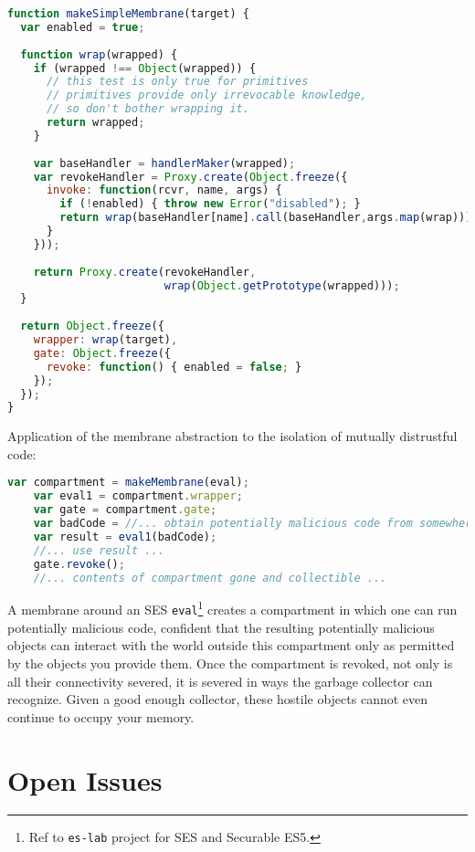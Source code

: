 \documentclass{acm_proc_article-sp}
\begin{document}
\begin{lstlisting}[language=javascript]
function makeSimpleMembrane(target) {
  var enabled = true;
  
  function wrap(wrapped) {
    if (wrapped !== Object(wrapped)) {
      // this test is only true for primitives
      // primitives provide only irrevocable knowledge,
      // so don't bother wrapping it.
      return wrapped;
    }
 
    var baseHandler = handlerMaker(wrapped);
    var revokeHandler = Proxy.create(Object.freeze({
      invoke: function(rcvr, name, args) {
        if (!enabled) { throw new Error("disabled"); }
        return wrap(baseHandler[name].call(baseHandler,args.map(wrap)));
      }
    }));
          
    return Proxy.create(revokeHandler, 
                        wrap(Object.getPrototype(wrapped)));
  }
    
  return Object.freeze({
    wrapper: wrap(target),
    gate: Object.freeze({
      revoke: function() { enabled = false; }
    });
  });
}
\end{lstlisting}

Application of the membrane abstraction to the isolation of mutually distrustful code:

\begin{lstlisting}[language=javascript]
    var compartment = makeMembrane(eval);
    var eval1 = compartment.wrapper;
    var gate = compartment.gate;
    var badCode = //... obtain potentially malicious code from somewhere ...
    var result = eval1(badCode);
    //... use result ...
    gate.revoke();
    //... contents of compartment gone and collectible ...
\end{lstlisting}

A membrane around an SES \texttt{eval}\footnote{Ref to \texttt{es-lab} project for SES and Securable ES5.} creates a compartment in which one can run potentially malicious code, confident that the resulting potentially malicious objects can interact with the world outside this compartment only as permitted by the objects you provide them. Once the compartment is revoked, not only is all their connectivity severed, it is severed in ways the garbage collector can recognize. Given a good enough collector, these hostile objects cannot even continue to occupy your memory.

\section{Open Issues}
\end{document}
